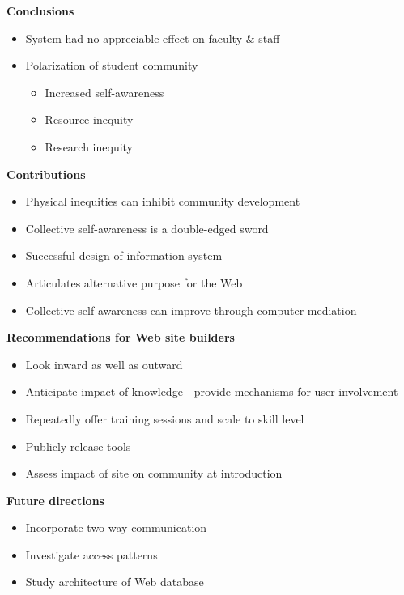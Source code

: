 \begin{slide}\Huge 
  {\bf Conclusions}
  \horizontalline
  \begin{itemize}
  \item System had no appreciable effect on faculty \& staff

  \item Polarization of student community

    \begin{itemize}
    \item Increased self-awareness

    \item Resource inequity

    \item Research inequity
    \end{itemize}
  \end{itemize}
\end{slide}\Huge 


\begin{slide}\Huge 
  {\bf Contributions}
  \horizontalline
  \begin{itemize}
  \item Physical inequities can inhibit community development

  \item Collective self-awareness is a double-edged sword

  \item Successful design of information system

  \item Articulates alternative purpose for the Web

  \item Collective self-awareness can improve through computer mediation
  \end{itemize}
\end{slide}\Huge 

\begin{slide}\Huge 
  {\bf Recommendations for Web site builders}
  \horizontalline
  \begin{itemize}
  \item Look inward as well as outward 

  \item Anticipate impact of knowledge - provide mechanisms for user involvement

  \item Repeatedly offer training sessions and scale to skill level

  \item Publicly release tools

  \item Assess impact of site on community at introduction
  \end{itemize}
\end{slide}\Huge 

\begin{slide}\Huge 
  {\bf Future directions}
  \horizontalline
  \begin{itemize}
  \item Incorporate two-way communication

  \item Investigate access patterns

  \item Study architecture of Web database
  \end{itemize}
\end{slide}\Huge 

 


